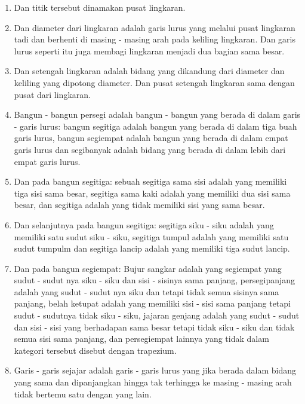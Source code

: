 \documentclass[a4paper]{book}
\begin{document}
\begin{enumerate}
\item Dan titik tersebut dinamakan pusat lingkaran.
\item Dan diameter dari lingkaran adalah garis lurus yang melalui 
pusat lingkaran tadi dan berhenti di masing - masing arah pada
keliling lingkaran. Dan garis lurus seperti itu juga membagi lingkaran 
menjadi dua bagian sama besar.
\item Dan setengah lingkaran adalah bidang yang dikandung dari diameter dan 
keliling yang dipotong diameter. Dan pusat setengah lingkaran sama dengan 
pusat dari lingkaran.
\item Bangun - bangun persegi adalah bangun - bangun yang berada di dalam
garis - garis lurus: bangun segitiga adalah bangun yang berada di dalam tiga buah
garis lurus, bangun segiempat adalah bangun yang berada di dalam empat garis lurus dan 
segibanyak adalah bidang yang berada di dalam lebih dari empat garis lurus.
\item Dan pada bangun segitiga: sebuah segitiga sama sisi adalah yang memiliki tiga
sisi sama besar, segitiga sama kaki adalah yang memiliki dua sisi sama besar, dan 
segitiga adalah yang tidak memiliki sisi yang sama besar.
\item Dan selanjutnya pada bangun segitiga: segitiga siku - siku adalah yang memiliki
satu sudut siku - siku, segitiga tumpul adalah yang memiliki satu sudut tumpulm dan 
segitiga lancip adalah yang memiliki tiga sudut lancip.
\item Dan pada bangun segiempat: Bujur sangkar adalah yang segiempat yang
sudut - sudut nya siku - siku dan sisi - sisinya sama panjang, persegipanjang
adalah yang sudut - sudut nya siku dan tetapi tidak semua sisinya sama panjang, 
belah ketupat adalah yang memiliki sisi - sisi sama panjang tetapi
sudut - sudutnya tidak siku - siku, jajaran genjang adalah yang sudut - sudut 
dan sisi - sisi yang berhadapan sama besar tetapi tidak siku - siku dan tidak 
semua sisi sama panjang, dan persegiempat lainnya yang tidak dalam kategori tersebut
disebut dengan trapezium.
\item Garis - garis sejajar adalah garis - garis lurus yang jika berada dalam 
bidang yang sama dan dipanjangkan hingga tak terhingga ke masing - masing arah
tidak bertemu satu dengan yang lain.  
\end{enumerate}
\end{document}
